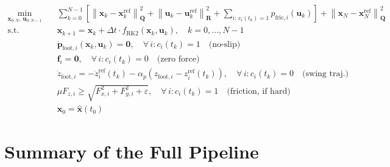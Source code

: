 \documentclass[11pt,a4paper]{article}
\newcommand{\wnorm}[2]{\left\| #1 \right\|_{#2}^2}
\begin{document}
\begin{equation}
	\boxed{
		\begin{aligned}
			\min_{\bm{x}_{0:N},\, \bm{u}_{0:N-1}} \quad
			 & \sum_{k=0}^{N-1} \left[
				\wnorm{\bm{x}_k - \bm{x}_k^{\text{ref}}}{\bm{Q}}
				+ \wnorm{\bm{u}_k - \bm{u}_k^{\text{ref}}}{\bm{R}}
				+ \sum_{i:\, c_i(t_k)=1} p_{\text{fric},i}(\bm{u}_k)
				\right]
			+ \wnorm{\bm{x}_N - \bm{x}_N^{\text{ref}}}{\bm{Q}}                                                                \\[6pt]
			\text{s.t.} \quad
			 & \bm{x}_{k+1} = \bm{x}_k + \Delta t \cdot f_{\text{RK2}}(\bm{x}_k, \bm{u}_k),
			\quad k = 0, \ldots, N{-}1                                                                                        \\[4pt]
			 & \dot{\bm{p}}_{\text{foot},i}(\bm{x}_k, \bm{u}_k) = \bm{0},
			\quad \forall\, i : c_i(t_k) = 1
			\quad \text{(no-slip)}                                                                                            \\[4pt]
			 & \bm{f}_i = \bm{0},
			\quad \forall\, i : c_i(t_k) = 0
			\quad \text{(zero force)}                                                                                         \\[4pt]
			 & \dot{z}_{\text{foot},i} = -\dot{z}_i^{\text{ref}}(t_k) - \alpha_p (z_{\text{foot},i} - z_i^{\text{ref}}(t_k)),
			\quad \forall\, i : c_i(t_k) = 0
			\quad \text{(swing traj.)}                                                                                        \\[4pt]
			 & \mu F_{z,i} \geq \sqrt{F_{x,i}^2 + F_{y,i}^2 + \varepsilon},
			\quad \forall\, i : c_i(t_k) = 1
			\quad \text{(friction, if hard)}                                                                                  \\[4pt]
			 & \bm{x}_0 = \hat{\bm{x}}(t_0)
		\end{aligned}
	}
\end{equation}


\section{Summary of the Full Pipeline}
\label{sec:pipeline}
\end{document}
